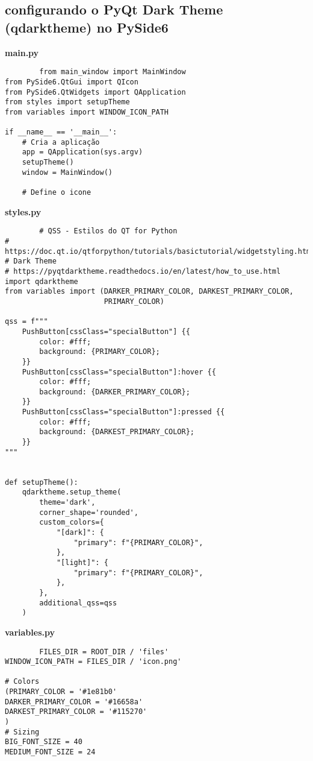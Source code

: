 \documentclass[12pt,a4paper]{article}
\begin{document}
    \subsection{configurando o PyQt Dark Theme (qdarktheme) no PySide6}
    \textbf{main.py}
    \begin{lstlisting}
        from main_window import MainWindow
from PySide6.QtGui import QIcon
from PySide6.QtWidgets import QApplication
from styles import setupTheme
from variables import WINDOW_ICON_PATH

if __name__ == '__main__':
    # Cria a aplicação
    app = QApplication(sys.argv)
    setupTheme()
    window = MainWindow()

    # Define o icone
    \end{lstlisting}
    \textbf{styles.py}
    \begin{lstlisting}
        # QSS - Estilos do QT for Python
# https://doc.qt.io/qtforpython/tutorials/basictutorial/widgetstyling.html
# Dark Theme
# https://pyqtdarktheme.readthedocs.io/en/latest/how_to_use.html
import qdarktheme
from variables import (DARKER_PRIMARY_COLOR, DARKEST_PRIMARY_COLOR,
                       PRIMARY_COLOR)

qss = f"""
    PushButton[cssClass="specialButton"] {{
        color: #fff;
        background: {PRIMARY_COLOR};
    }}
    PushButton[cssClass="specialButton"]:hover {{
        color: #fff;
        background: {DARKER_PRIMARY_COLOR};
    }}
    PushButton[cssClass="specialButton"]:pressed {{
        color: #fff;
        background: {DARKEST_PRIMARY_COLOR};
    }}
"""


def setupTheme():
    qdarktheme.setup_theme(
        theme='dark',
        corner_shape='rounded',
        custom_colors={
            "[dark]": {
                "primary": f"{PRIMARY_COLOR}",
            },
            "[light]": {
                "primary": f"{PRIMARY_COLOR}",
            },
        },
        additional_qss=qss
    )
    \end{lstlisting}
    \textbf{variables.py}
    \begin{lstlisting}
        FILES_DIR = ROOT_DIR / 'files'
WINDOW_ICON_PATH = FILES_DIR / 'icon.png'

# Colors
(PRIMARY_COLOR = '#1e81b0'
DARKER_PRIMARY_COLOR = '#16658a'
DARKEST_PRIMARY_COLOR = '#115270'
)
# Sizing
BIG_FONT_SIZE = 40
MEDIUM_FONT_SIZE = 24
    \end{lstlisting}
\end{document}
